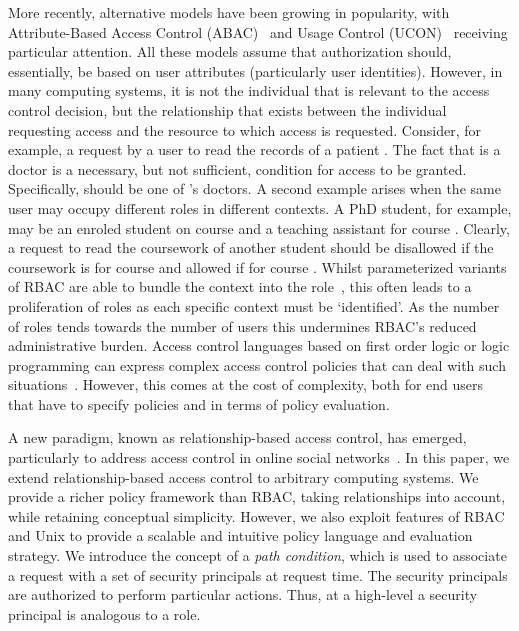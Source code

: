 \documentclass{article}
\begin{document}
More recently, alternative models have been growing in popularity, with Attribute-Based Access Control (ABAC)~\cite{Al-KahtaniS02} and Usage Control (UCON)~\cite{SandhuP03} receiving particular attention.
All these models assume that authorization should, essentially, be based on user attributes (particularly user identities).
However, in many computing systems, it is not the individual that is relevant to the access control decision, but the relationship that exists between the individual requesting access and the resource to which access is requested.
Consider, for example, a request by a user  to read the records of a patient .
The fact that  is a doctor is a necessary, but not sufficient, condition for access to be granted.
Specifically,  should be one of 's doctors.
A second example arises when the same user may occupy different roles in different contexts.
A PhD student, for example, may be an enroled student on course  and a teaching assistant for course .
Clearly, a request to read the coursework of another student should be disallowed if the coursework is for course  and allowed if for course .
Whilst parameterized variants of RBAC are able to bundle the context into the role~\cite{GiuriI97}, this often leads to a proliferation of roles as each specific context must be `identified'.
As the number of roles tends towards the number of users this undermines RBAC's reduced administrative burden.
Access control languages based on first order logic or logic programming can express complex access control policies that can deal with such situations~\cite{BeckerFG10,GurevishN08}.
However, this comes at the cost of complexity, both for end users that have to specify policies and in terms of policy evaluation.

A new paradigm, known as relationship-based access control, has emerged, particularly to address access control in online social networks~\cite{CarminatiFP09,Fong11}.
In this paper, we extend relationship-based access control to arbitrary computing systems.
We provide a richer policy framework than RBAC, taking relationships into account, while retaining conceptual simplicity.
However, we also exploit features of RBAC and Unix to provide a scalable and intuitive policy language and evaluation strategy.
We introduce the concept of a \emph{path condition}, which is used to associate a request with a set of security principals at request time.
The security principals are authorized to perform particular actions.
Thus, at a high-level a security principal is analogous to a role.
\end{document}
